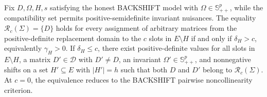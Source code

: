 Fix \(D,\Omega,H,s\) satisfying the honest BACKSHIFT model with \(\Omega\in\mathbb S_{++}^{p}\), while the compatibility set permits positive-semidefinite invariant nuisances. The equality \(\mathcal R_c(\Sigma)=\{D\}\) holds for every assignment of arbitrary matrices from the positive-definite replacement domain to the \(c\) slots in \(E\setminus H\) if and only if \(\delta_H>c\), equivalently \(\gamma_H>0\). If \(\delta_H\le c\), there exist positive-definite values for all slots in \(E\setminus H\), a matrix \(D'\in\mathcal D\) with \(D'\ne D\), an invariant \(\Omega'\in\mathbb S_{++}^{p}\), and nonnegative shifts on a set \(H'\subseteq E\) with \(|H'|=h\) such that both \(D\) and \(D'\) belong to \(\mathcal R_c(\Sigma)\). At \(c=0\), the equivalence reduces to the BACKSHIFT pairwise noncollinearity criterion.